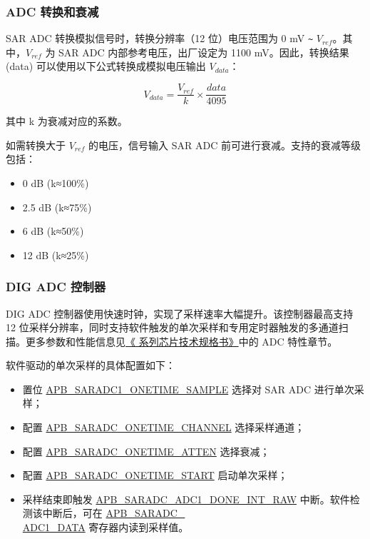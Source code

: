 \documentclass[main\_\_CN.tex]{subfiles}
\begin{document}
\subsubsection{ADC 转换和衰减}

SAR ADC 转换模拟信号时，转换分辨率（12 位）电压范围为 0 mV \verb+~+ \(V_{ref}\)。其中，\(V_{ref}\) 为 SAR ADC 内部参考电压，出厂设定为 1100 mV。因此，转换结果 (data) 可以使用以下公式转换成模拟电压输出 \(V_{data}\)：

    \[
    V_{data} = \frac{V_{ref}}{k}\times{\frac{data}{4095}}
    \]

其中 k 为衰减对应的系数。

如需转换大于 \(V_{ref}\) 的电压，信号输入 SAR ADC 前可进行衰减。支持的衰减等级包括：

\begin{itemize}
    \item 0 dB (k≈100\%)
    \item 2.5 dB (k≈75\%)
    \item 6 dB (k≈50\%)
    \item 12 dB (k≈25\%)
\end{itemize}

\subsubsection{DIG ADC 控制器}


DIG ADC 控制器使用快速时钟，实现了采样速率大幅提升。该控制器最高支持 12 位采样分辨率，同时支持软件触发的单次采样和专用定时器触发的多通道扫描。更多参数和性能信息见\href{https://www.espressif.com/sites/default/files/documentation/esp8684_datasheet_en.pdf}{《\chipname{} 系列芯片技术规格书》}中的 ADC 特性章节。

软件驱动的单次采样的具体配置如下：
\begin{itemize}
    \item 置位 \hyperref[fielddesc:APBSARADCSARADC1ONETIMESAMPLE]{APB\_SARADC1\_ONETIME\_SAMPLE} 选择对 SAR ADC 进行单次采样；
    \item 配置 \hyperref[fielddesc:APBSARADCSARADCONETIMECHANNEL]{APB\_SARADC\_ONETIME\_CHANNEL} 选择采样通道；
    \item 配置 \hyperref[fielddesc:APBSARADCSARADCONETIMEATTEN]{APB\_SARADC\_ONETIME\_ATTEN} 选择衰减；
    \item 配置 \hyperref[fielddesc:APBSARADCSARADCONETIMESTART]{APB\_SARADC\_ONETIME\_START} 启动单次采样；
    \item 采样结束即触发 \hyperref[fielddesc:APBSARADCAPBSARADC1DONEINTRAW]{APB\_SARADC\_ADC1\_DONE\_INT\_RAW} 中断。软件检测该中断后，可在 \hyperref[fielddesc:APBSARADCAPBSARADC1DATA]{APB\_SARADC\_\\ADC1\_DATA} 寄存器内读到采样值。
\end{itemize}
\end{document}
